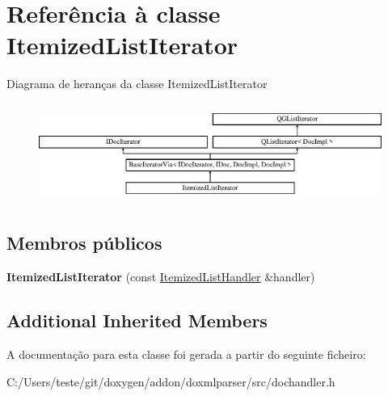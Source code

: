 \hypertarget{class_itemized_list_iterator}{\section{Referência à classe Itemized\-List\-Iterator}
\label{class_itemized_list_iterator}
}
Diagrama de heranças da classe Itemized\-List\-Iterator\begin{figure}[H]
\begin{center}
\leavevmode
\includegraphics[height=3.294118cm]{class_itemized_list_iterator}
\end{center}
\end{figure}
\subsection*{Membros públicos}
\begin{DoxyCompactItemize}
\item 
\hypertarget{class_itemized_list_iterator_a480e8cac7a4c31e67d8da7dcbec9bd17}{{\bfseries Itemized\-List\-Iterator} (const \hyperlink{class_itemized_list_handler}{Itemized\-List\-Handler} \&handler)}\label{class_itemized_list_iterator_a480e8cac7a4c31e67d8da7dcbec9bd17}

\end{DoxyCompactItemize}
\subsection*{Additional Inherited Members}


A documentação para esta classe foi gerada a partir do seguinte ficheiro\-:\begin{DoxyCompactItemize}
\item 
C\-:/\-Users/teste/git/doxygen/addon/doxmlparser/src/dochandler.\-h\end{DoxyCompactItemize}
